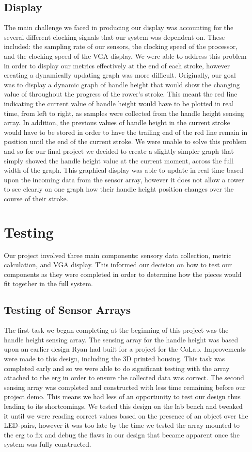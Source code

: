 \documentclass[letterpaper]{article} %
\begin{document}
\subsection{Display}
The main challenge we faced in producing our display was accounting for the several different clocking signals that our system was dependent on. These included: the sampling rate of our sensors, the clocking speed of the processor, and the clocking speed of the VGA display. We were able to address this problem in order to display our metrics effectively at the end of each stroke, however creating a dynamically updating graph was more difficult.
Originally, our goal was to display a dynamic graph of handle height that would show the changing value of throughout the progress of the rower's stroke. This meant the red line indicating the current value of handle height would have to be plotted in real time, from left to right, as samples were collected from the handle height sensing array. In addition, the previous values of handle height in the current stroke would have to be stored in order to have the trailing end of the red line remain in position until the end of the current stroke. We were unable to solve this problem and so for our final project we decided to create a slightly simpler graph that simply showed the handle height value at the current moment, across the full width of the graph. This graphical display was able to update in real time based upon the incoming data from the sensor array, however it does not allow a rower to see clearly on one graph how their handle height position changes over the course of their stroke.

\section{Testing}
Our project involved three main components: sensory data collection, metric calculation, and VGA display. This informed our decision on how to test our components as they were completed in order to determine how the pieces would fit together in the full system.
\subsection{Testing of Sensor Arrays}
The first task we began completing at the beginning of this project was the handle height sensing array. The sensing array for the handle height was based upon an earlier design Ryan had built for a project for the CoLab. Improvements were made to this design, including the 3D printed housing. This task was completed early and so we were able to do significant testing with the array attached to the erg in order to ensure the collected data was correct. The second sensing array was completed and constructed with less time remaining before our project demo. This means we had less of an opportunity to test our design thus leading to its shortcomings. We tested this design on the lab bench and tweaked it until we were reading correct values based on the presence of an object over the LED-pairs, however it was too late by the time we tested the array mounted to the erg to fix and debug the flaws in our design that became apparent once the system was fully constructed.
\end{document}
